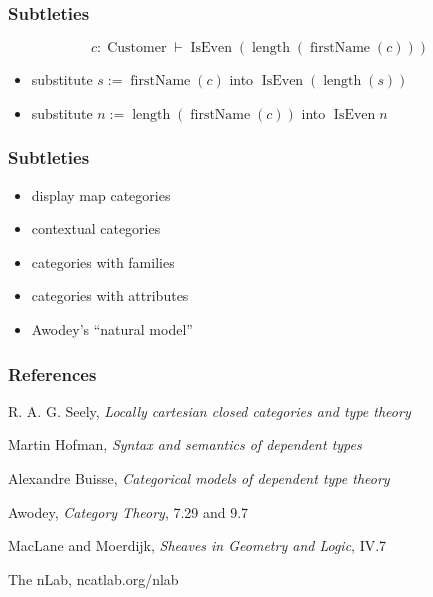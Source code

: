 \documentclass[
  xcolor={usenames,dvipsnames,svgnames},
  ]{beamer}
\DeclareMathOperator{\Customer}{Customer}
\DeclareMathOperator{\IsEven}{IsEven}
\begin{document}
\begin{frame}
\frametitle{Subtleties}
\begin{center}

  \[
    c : \Customer \vdash \IsEven (\operatorname{length}(\operatorname{firstName}(c)))
  \]

  \begin{itemize}
    \item substitute $s := \operatorname{firstName}(c)$ into $\IsEven(\operatorname{length}(s))$
    \item substitute $n := \operatorname{length}(\operatorname{firstName}(c))$ into $\IsEven n$
  \end{itemize}
\end{center}
\end{frame}

\begin{frame}
\frametitle{Subtleties}
\begin{center}

  \begin{itemize}
    \item display map categories
    \item contextual categories
    \item categories with families
    \item categories with attributes
    \item Awodey's ``natural model''
  \end{itemize}
\end{center}
\end{frame}

\begin{frame}
\frametitle{References}
R. A. G. Seely, \textit{Locally cartesian closed categories and type theory}

Martin Hofman, \textit{Syntax and semantics of dependent types}

Alexandre Buisse, \textit{Categorical models of dependent type theory}

Awodey, \textit{Category Theory}, 7.29 and 9.7

MacLane and Moerdijk, \textit{Sheaves in Geometry and Logic}, IV.7

The nLab, ncatlab.org/nlab

\end{frame}

\begin{frame}
\frametitle{}
\begin{center}

\end{center}
\end{frame}
\end{document}
